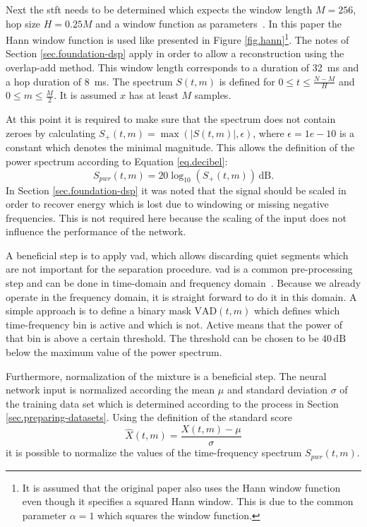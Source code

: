 Next the \gls{stft} needs to be determined which expects the window length $M=256$, hop size $H=0.25M$ and a window function as parameters~\cite{Hershey2016}. In this paper the Hann window function is used like presented in Figure \ref{fig.hann}\footnote{It is assumed that the original paper also uses the Hann window function even though it specifies a squared Hann window. This is due to the common parameter $\alpha=1$ which squares the window function.}.
The notes of Section \ref{sec.foundation-dsp} apply in order to allow a reconstruction using the overlap-add method.
This window length corresponds to a duration of \SI{32}{\ms} and a hop duration of \SI{8}{\ms}.
The spectrum $S(t, m)$ is defined for $0 \le t \le \frac{N-M}{H}$ and $0 \le m \le \frac{M}{2}$. It is assumed $x$ has at least $M$ samples.

At this point it is required to make sure that the spectrum does not contain zeroes by calculating $S_+(t, m) = \max(|S(t, m)|, \epsilon)$, where $\epsilon=1e-10$ is a constant which denotes the minimal magnitude.
This allows the definition of the power spectrum according to Equation \ref{eq.decibel}:
\begin{equation}
	S_{pwr}(t,m)=20\log_{10}(S_+(t, m))\,\si{\dB}.
\end{equation}
In Section \ref{sec.foundation-dsp} it was noted that the signal should be scaled in order to recover energy which is lost due to windowing or missing negative frequencies.
This is not required here because the scaling of the input does not influence the performance of the network.

\label{paragraph.vad}
A beneficial step is to apply \gls{vad}, which allows discarding quiet segments which are not important for the separation procedure. \gls{vad} is a common pre-processing step and can be done in time-domain and frequency domain~\cite{Adiga2016}. Because we already operate in the frequency domain, it is straight forward to do it in this domain. A simple approach is to define a binary mask $\mathrm{VAD}(t,m)$ which defines which time-frequency bin is active and which is not. Active means that the power of that bin is above a certain threshold. The threshold can be chosen to be $40\,\si{\dB}$ below the maximum value of the power spectrum.

Furthermore, normalization of the mixture is a beneficial step. The neural network input is normalized according the mean $\mu$ and standard deviation $\sigma$ of the training data set which is determined according to the process in Section \ref{sec.preparing-datasets}. Using the definition of the standard score~\cite[p.~1018]{Kreyszig2006}
\begin{equation}
	\hat{X}(t,m)=\frac{X(t,m)-\mu}{\sigma}
	\label{eq.standard-score}
\end{equation}
it is possible to normalize the values of the time-frequency spectrum $S_{pwr}(t, m)$.

